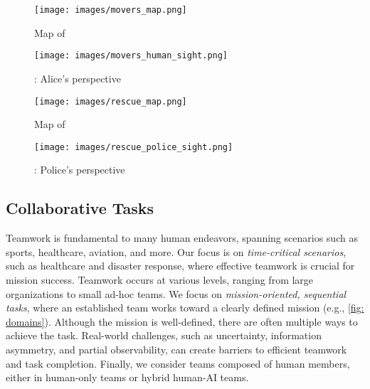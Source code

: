 \begin{figure*}[h]
  \centering
  \begin{subfigure}[b]{0.245\linewidth}
      \centering
      \texttt{[image: images/movers\_map.png]}
      \caption{Map of \movers}
      \label{fig: movers}
  \end{subfigure}
  \hfill  
  \begin{subfigure}[b]{0.245\linewidth}
      \centering
      \texttt{[image: images/movers\_human\_sight.png]}
      \caption{\movers: Alice's perspective}
      \label{fig: movers human sight}
  \end{subfigure}
  \hfill  
  \begin{subfigure}[b]{0.245\linewidth}
      \centering
      \texttt{[image: images/rescue\_map.png]}
      \caption{Map of \rescue}
      \label{fig: rescue}
  \end{subfigure}
  \hfill  
  \begin{subfigure}[b]{0.245\linewidth}
      \centering
      \texttt{[image: images/rescue\_police\_sight.png]}
      \caption{\rescue: Police's perspective}
      \label{fig: rescue human sight}
  \end{subfigure}

  \captionsetup{subrefformat=parens}
  \caption{\movers and \rescue domains, detailed in \cref{sec. domains}. Team members can observe only the unshaded region of the environment.}
  \label{fig: domains}
\end{figure*}
\subsection{Collaborative Tasks}
\label{sec. task model}
Teamwork is fundamental to many human endeavors, spanning scenarios such as sports, healthcare, aviation, and more. Our focus is on \textit{time-critical scenarios}, such as healthcare and disaster response, where effective teamwork is crucial for mission success. Teamwork occurs at various levels, ranging from large organizations to small ad-hoc teams. We focus on \textit{mission-oriented, sequential tasks}, where an established team works toward a clearly defined mission (e.g., \cref{fig: domains}). Although the mission is well-defined, there are often multiple ways to achieve the task. Real-world challenges, such as uncertainty, information asymmetry, and partial observability, can create barriers to efficient teamwork and task completion. Finally, we consider teams composed of human members, either in human-only teams or hybrid human-AI teams.

